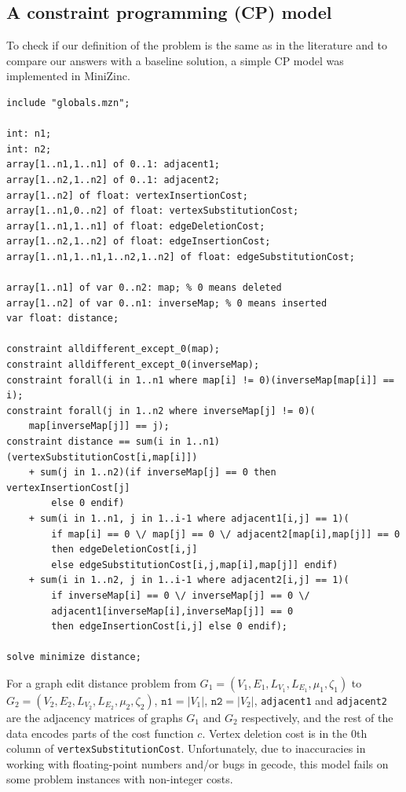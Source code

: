 \documentclass{article}
\theoremstyle{definition}
\begin{document}
\subsection{A constraint programming (CP) model}
To check if our definition of the problem is the same as in the literature and to compare our answers with a baseline solution, a simple CP model was implemented in MiniZinc.
\begin{lstlisting}
include "globals.mzn";

int: n1;
int: n2;
array[1..n1,1..n1] of 0..1: adjacent1;
array[1..n2,1..n2] of 0..1: adjacent2;
array[1..n2] of float: vertexInsertionCost;
array[1..n1,0..n2] of float: vertexSubstitutionCost;
array[1..n1,1..n1] of float: edgeDeletionCost;
array[1..n2,1..n2] of float: edgeInsertionCost;
array[1..n1,1..n1,1..n2,1..n2] of float: edgeSubstitutionCost;

array[1..n1] of var 0..n2: map; % 0 means deleted
array[1..n2] of var 0..n1: inverseMap; % 0 means inserted
var float: distance;

constraint alldifferent_except_0(map);
constraint alldifferent_except_0(inverseMap);
constraint forall(i in 1..n1 where map[i] != 0)(inverseMap[map[i]] == i);
constraint forall(j in 1..n2 where inverseMap[j] != 0)(
    map[inverseMap[j]] == j);
constraint distance == sum(i in 1..n1)(vertexSubstitutionCost[i,map[i]])
    + sum(j in 1..n2)(if inverseMap[j] == 0 then vertexInsertionCost[j]
        else 0 endif)
    + sum(i in 1..n1, j in 1..i-1 where adjacent1[i,j] == 1)(
        if map[i] == 0 \/ map[j] == 0 \/ adjacent2[map[i],map[j]] == 0
        then edgeDeletionCost[i,j]
        else edgeSubstitutionCost[i,j,map[i],map[j]] endif)
    + sum(i in 1..n2, j in 1..i-1 where adjacent2[i,j] == 1)(
        if inverseMap[i] == 0 \/ inverseMap[j] == 0 \/
        adjacent1[inverseMap[i],inverseMap[j]] == 0
        then edgeInsertionCost[i,j] else 0 endif);

solve minimize distance;
\end{lstlisting}
For a graph edit distance problem from $G_1 = (V_1, E_1, L_{V_1}, L_{E_1}, \mu_1, \zeta_1)$ to $G_2 = (V_2, E_2, L_{V_2}, L_{E_2}, \mu_2, \zeta_2)$, $\texttt{n1} = |V_1|$, $\texttt{n2} = |V_2|$, \texttt{adjacent1} and \texttt{adjacent2} are the adjacency matrices of graphs $G_1$ and $G_2$ respectively, and the rest of the data encodes parts of the cost function $c$. Vertex deletion cost is in the 0th column of \texttt{vertexSubstitutionCost}. Unfortunately, due to inaccuracies in working with floating-point numbers and/or bugs in gecode, this model fails on some problem instances with non-integer costs.
\end{document}

